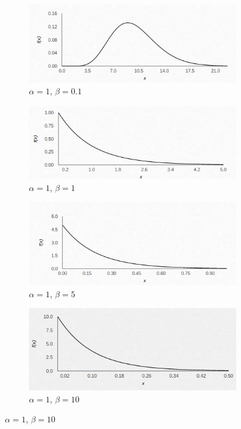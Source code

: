 \documentclass[a4paper,12pt]{article} %
\begin{document}
\begin{figure}[H]
	\begin{subfigure}{.4\textwidth}
		\centering
		\includegraphics[width=.8\linewidth]{Gamma/Gamma_alp1_bet01.png}
		\caption{$\alpha = 1 $, $\beta = 0.1 $}
	\end{subfigure}%
	\begin{subfigure}{.4\textwidth}
		\centering
		\includegraphics[width=.8\linewidth]{Gamma/Gamma_alp1_bet1.png}
		\caption{$\alpha = 1 $, $\beta = 1 $}
	\end{subfigure}%
	
	
	\begin{subfigure}{.4\textwidth}
		\centering
		\includegraphics[width=.8\linewidth]{Gamma/Gamma_alp1_bet5.png}
		\caption{$\alpha = 1 $, $\beta = 5 $}
	\end{subfigure}%
	\begin{subfigure}{.4\textwidth}
		\centering
		\includegraphics[width=.8\linewidth]{Gamma/Gamma_alp1_bet10.png}
		\caption{$\alpha = 1 $, $\beta = 10 $}
	\end{subfigure}%
	

\end{figure}
\end{document}
